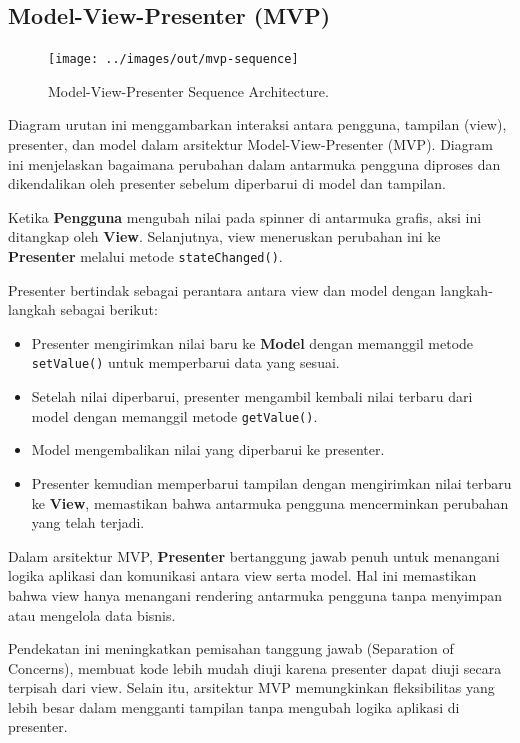 \subsection{Model-View-Presenter (MVP)}
\begin{figure}[h]
	\centering
	\texttt{[image: ../images/out/mvp-sequence]}
	\caption{Model-View-Presenter Sequence Architecture.}
	\label{fig:mvp-sequence}
\end{figure}

Diagram urutan ini menggambarkan interaksi antara pengguna, tampilan (view), presenter, dan model dalam arsitektur Model-View-Presenter (MVP). Diagram ini menjelaskan bagaimana perubahan dalam antarmuka pengguna diproses dan dikendalikan oleh presenter sebelum diperbarui di model dan tampilan.

Ketika \textbf{Pengguna} mengubah nilai pada spinner di antarmuka grafis, aksi ini ditangkap oleh \textbf{View}. Selanjutnya, view meneruskan perubahan ini ke \textbf{Presenter} melalui metode \texttt{stateChanged()}.

Presenter bertindak sebagai perantara antara view dan model dengan langkah-langkah sebagai berikut:

\begin{itemize}
	\item Presenter mengirimkan nilai baru ke \textbf{Model} dengan memanggil metode \texttt{setValue()} untuk memperbarui data yang sesuai.
	\item Setelah nilai diperbarui, presenter mengambil kembali nilai terbaru dari model dengan memanggil metode \texttt{getValue()}.
	\item Model mengembalikan nilai yang diperbarui ke presenter.
	\item Presenter kemudian memperbarui tampilan dengan mengirimkan nilai terbaru ke \textbf{View}, memastikan bahwa antarmuka pengguna mencerminkan perubahan yang telah terjadi.
\end{itemize}

Dalam arsitektur MVP, \textbf{Presenter} bertanggung jawab penuh untuk menangani logika aplikasi dan komunikasi antara view serta model. Hal ini memastikan bahwa view hanya menangani rendering antarmuka pengguna tanpa menyimpan atau mengelola data bisnis.

Pendekatan ini meningkatkan pemisahan tanggung jawab (Separation of Concerns), membuat kode lebih mudah diuji karena presenter dapat diuji secara terpisah dari view. Selain itu, arsitektur MVP memungkinkan fleksibilitas yang lebih besar dalam mengganti tampilan tanpa mengubah logika aplikasi di presenter.

